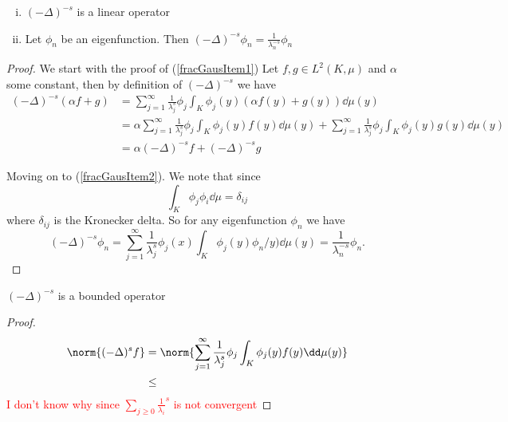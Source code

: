 \begin{prop}\label{fracLaplacianProperties}\phantom{a}
	
	\begin{enumerate}[(i)]
		\item 	$(-\Delta)^{-s}$ is a linear operator\label{fracGausItem1}
		\item Let $\phi_n$ be an eigenfunction. Then $(-\Delta)^{-s}\phi_n = \frac{1}{\lambda_{n}^{-s}}\phi_{n}$ \label{fracGausItem2}
	\end{enumerate}
\end{prop}
\begin{proof}
	
	We start with the proof of (\ref{fracGausItem1})
	Let $f,g \in L^{2}(K, \mu)$ and $\alpha$ some constant, then by definition of $(-\Delta)^{-s}$ we have
	\begin{align}
		(-\Delta)^{-s}(\alpha f + g) &= \sum_{j = 1}^{\infty} \frac{1}{\lambda_{j}^{s}} \phi_j \int_{K} \phi_j(y)(\alpha f(y) + g(y)) \dd \mu(y)\\
		& = \alpha \sum_{j = 1}^{\infty} \frac{1}{\lambda_{j}^{s}} \phi_j \int_{K} \phi_j(y)f(y)  \dd \mu(y) + \sum_{j = 1}^{\infty} \frac{1}{\lambda_{j}^{s}} \phi_j \int_{K} \phi_j(y)g(y) \dd \mu(y) \\
		&=\alpha (-\Delta)^{-s}f + (-\Delta)^{-s}g
	\end{align}
	
	Moving on to (\ref{fracGausItem2}). We note that since
	\begin{equation}
		\int_{K}\phi_j \phi_i \dd \mu = \delta_{ij}
	\end{equation}
	where $\delta_{ij}$ is the Kronecker delta. So for any eigenfunction $\phi_n$ we have
	\begin{equation}
		(-\Delta)^{-s}\phi_n = \sum_{j = 1}^{\infty} \frac{1}{\lambda_{j}^{s}} \phi_j(x) \int_{K}\phi_j(y)\phi_n/y) \dd \mu(y) = \frac{1}{\lambda_{n}^{-s}}\phi_{n}.
	\end{equation}
\end{proof}

\begin{prop}
	$(-\Delta)^{-s}$ is a bounded operator
\end{prop}
\begin{proof}
	\begin{align}
			\norm{(-\Delta)^{s}f} &= \norm{\sum_{j = 1}^{\infty} \frac{1}{\lambda_{j}^{s}} \phi_j \int_{K} \phi_j(y)f(y) \dd \mu(y)} \\
			&\leq 
	\end{align}
	\textcolor{red}{I don't know why since $\sum_{j \geq 0} \frac{1}{\lambda_i}^{s}$ is not convergent} 
\end{proof}

